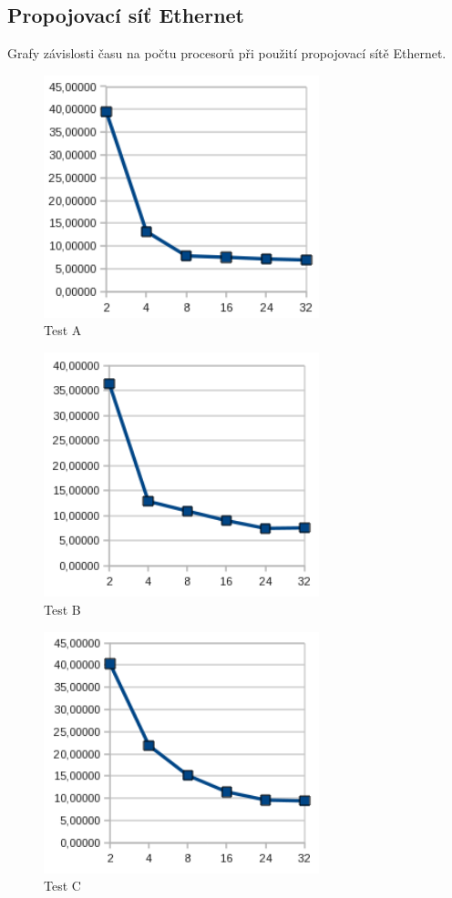\documentclass[12pt]{article}
\begin{document}
\subsection{Propojovací síť Ethernet}
Grafy závislosti času na počtu procesorů při použití propojovací sítě Ethernet.
\begin{figure}[H]
\begin{center}
\includegraphics[width=8cm]{grafy-zprava/testAeth.png}
\caption{Test A}
\label{fig:testAether}
\end{center}
\end{figure}

\begin{figure}[H]
\begin{center}
\includegraphics[width=8cm]{grafy-zprava/testBeth.png}
\caption{Test B}
\label{fig:testBether}
\end{center}
\end{figure}

\begin{figure}[H]
\begin{center}
\includegraphics[width=8cm]{grafy-zprava/testCeth.png}
\caption{Test C}
\label{fig:testCether}
\end{center}
\end{figure}
\end{document}
